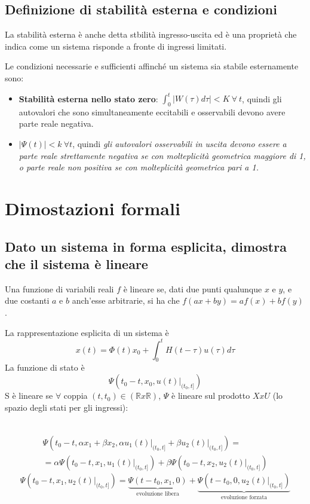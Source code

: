 \documentclass{article}
\begin{document}
\subsection{Definizione di stabilità esterna e condizioni}
La stabilità esterna è anche detta stbilità ingresso-uscita
ed è una proprietà che indica come un sistema risponde
a fronte di ingressi limitati.

Le condizioni necessarie e sufficienti affinché un sistema sia stabile esternamente sono:
\begin{itemize}
\item  \textbf{Stabilità esterna nello stato zero}:
\(\displaystyle \int_{0}^{t} |W(\tau)d\tau|< K\ \forall\ t\),
quindi gli autovalori che sono simultaneamente eccitabili e osservabili
devono avere parte reale negativa.
\item $|\Psi(t)|<k\ \forall t$,
quindi \textit{gli autovalori osservabili in uscita devono essere a parte
reale strettamente negativa se con molteplicità geometrica maggiore di 1,
o parte reale non positiva se con molteplicità geometrica pari a 1.}
\end{itemize}

\section{Dimostazioni formali}

\subsection{Dato un sistema in forma esplicita, dimostra che il sistema è lineare}
Una funzione di variabili reali $f$ è lineare se, dati due punti qualunque
$x$ e $y$, e due costanti $a$ e $b$ anch'esse arbitrarie, si ha che $f(ax+by)=af(x)+bf(y)$.

La rappresentazione esplicita di un sistema è 
\[ x(t) = \Phi(t)x_0 +\int_{0}^{t} H(t-\tau) u(\tau) d \tau
\]
La funzione di stato è
\[ \Psi \left(t_0-t,x_0,\left.u(t)\right|_{(t_0,t]}\right) \]
S è lineare se $\forall$ coppia $(t,t_0) \in (\mathbb{R}x\mathbb{R})$, $\Psi$ è lineare sul prodotto $XxU$ 
(lo spazio degli stati per gli ingressi):

\
\begin{align*}
    \Psi \left(t_0-t,\alpha x_1+\beta x_2,\alpha\left.u_1(t)\right|_{(t_0,t]}+\beta\left.u_2(t)\right|_{(t_0,t]}\right) =\\
    = \alpha\Psi \left(t_0-t,x_1,\left.u_1(t)\right|_{(t_0,t]}\right)+\beta\Psi \left(t_0-t,x_2,\left.u_2(t)\right|_{(t_0,t]}\right)
\end{align*}
\[
    \Psi \left(t_0-t,x_1,\left.u_2(t)\right|_{(t_0,t]}\right)  = \underbrace{\Psi\left(t-t_0,x_1,0\right)}_{\text{evoluzione libera}}+
    \underbrace{\Psi\left(t-t_0,0,\left.u_2(t)\right|_{(t_0,t]}\right)}_{\text{evoluzione forzata}}
\]
\end{document}
